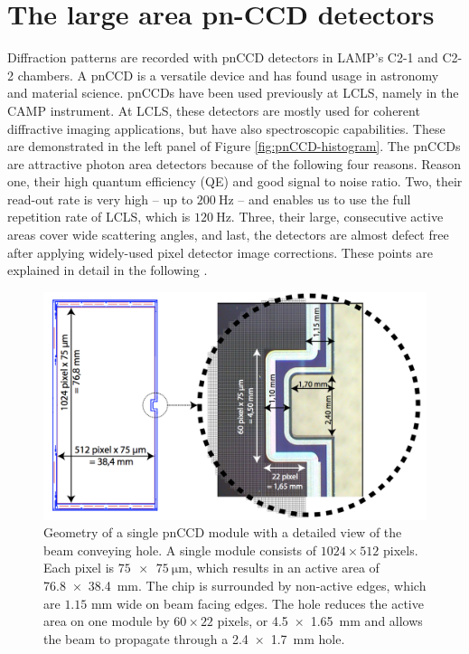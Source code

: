 \section{The large area pn-CCD detectors}\label{sec:pnCCD}
Diffraction patterns are recorded with pnCCD detectors in LAMP's C2-1 and C2-2 chambers. A pnCCD is a versatile device and has found usage in astronomy and material science. pnCCDs have been used previously at LCLS, namely in the CAMP instrument. At LCLS, these detectors are mostly used for coherent diffractive imaging applications, but have also spectroscopic capabilities. These are demonstrated in the left panel of Figure \ref{fig:pnCCD-histogram}. The pnCCDs are attractive photon area detectors because of the following four reasons. Reason one, their high quantum efficiency (QE) and good signal to noise ratio. Two, their read-out rate is very high -- up to $\SI{200}{\hertz}$ -- and enables us to use the full repetition rate of LCLS, which is $\SI{120}{\hertz}$. Three, their large, consecutive active areas cover wide scattering angles, and last, the detectors are almost defect free after applying widely-used pixel detector image corrections. These points are explained in detail in the following \citep{Bucher-2016-Unpublished}.\\[1\baselineskip]
%
\begin{figure}
   \includegraphics[width=0.8\linewidth]{images/pnCCD-detail.png}
    \caption[Geometry of a single pnCCD module.]{Geometry of a single pnCCD module with a detailed view of the beam conveying hole. A single module consists of $1024 \times 512$ pixels. Each pixel is $\SI{75 x 75}{\micro\meter}$, which results in an active area of \SI{76.8 x 38.4}{\milli\meter}. The chip is surrounded by non-active edges, which are $1.15$ mm wide on beam facing edges. The hole reduces the active area on one module by $60\times 22$ pixels, or \SI{4.5 x 1.65}{\milli\meter} and allows the beam to propagate through a \SI{2.4 x 1.7}{\milli\meter} hole.}
\label{fig:ccd-detail}
\end{figure}
